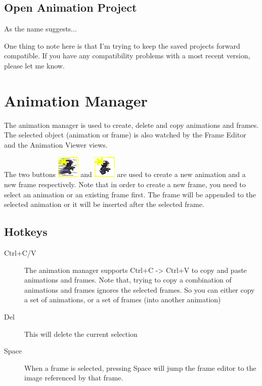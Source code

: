 \documentclass{article}
\begin{document}
\subsection{Open Animation Project}
As the name suggests... 

One thing to note here is that I'm trying to keep the saved projects forward compatible. If you have any compatibility problems with a most recent version, please let me know.

\section{Animation Manager}
\label{sec:AnimationManager}
The animation manager is used to create, delete and copy animations and frames. The selected object (animation or frame) is also watched by the Frame Editor and the
Animation Viewer views.

The two buttons \includegraphics{icons/NewAnimation} and \includegraphics{icons/NewFrame} are used to create a new animation and a new frame respectively. Note that
in order to create a new frame, you need to select an animation or an existing frame first. The frame will be appended to the selected animation or it will be
inserted after the selected frame.

\subsection{Hotkeys}
\begin{description}
\item[Ctrl+C/V] The animation manager supports Ctrl+C -> Ctrl+V to copy and paste animations and frames. Note that, trying to copy a combination of animations and frames ignores the selected frames. So you can either copy a set of animations, or a set of frames (into another animation)
\item[Del]   This will delete the current selection
\item[Space] When a frame is selected, pressing Space will jump the frame editor to the image referenced by that frame.
\end{description}
\end{document}

